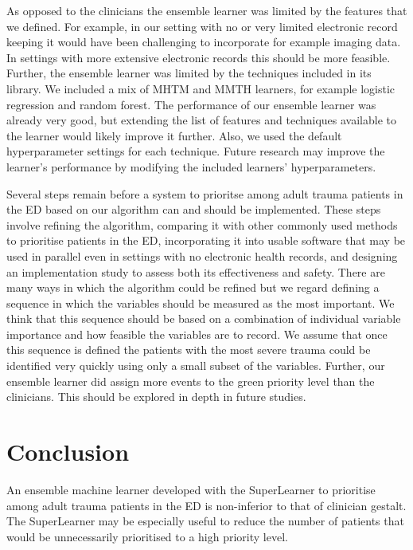 \documentclass[10pt,letterpaper]{article}\usepackage[]{graphicx}\usepackage[]{color}
\begin{document}
As opposed to the clinicians the ensemble learner was limited by the features
that we defined. For example, in our setting with no or very limited electronic
record keeping it would have been challenging to incorporate for example imaging
data. In settings with more extensive electronic records this should be more
feasible. Further, the ensemble learner was limited by the techniques included
in its library. We included a mix of MHTM and MMTH learners, for example
logistic regression and random forest. The performance of our ensemble learner
was already very good, but extending the list of features and techniques
available to the learner would likely improve it further.  Also, we used the
default hyperparameter settings for each technique. Future research may improve
the learner's performance by modifying the included learners' hyperparameters.

Several steps remain before a system to prioritse among adult trauma patients in
the ED based on our algorithm can and should be implemented. These steps involve
refining the algorithm, comparing it with other commonly used methods to
prioritise patients in the ED, incorporating it into usable software that may be
used in parallel even in settings with no electronic health records, and
designing an implementation study to assess both its effectiveness and
safety. There are many ways in which the algorithm could be refined but we
regard defining a sequence in which the variables should be measured as the most
important. We think that this sequence should be based on a combination of
individual variable importance and how feasible the variables are to record. We
assume that once this sequence is defined the patients with the most severe
trauma could be identified very quickly using only a small subset of the
variables. Further, our ensemble learner did assign more events to the green
priority level than the clinicians. This should be explored in depth in future
studies.

\section*{Conclusion}
An ensemble machine learner developed with the SuperLearner to prioritise among
adult trauma patients in the ED is non-inferior to that of clinician
gestalt. The SuperLearner may be especially useful to reduce the number of
patients that would be unnecessarily prioritised to a high priority level.

\end{document}
